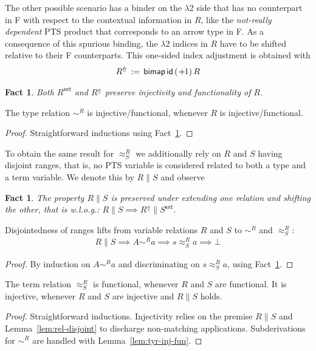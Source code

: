 \documentclass[a4paper,UKenglish]{lipics-v2016}
\newcommand{\ms}{\,}
\newcommand{\mrel}[1]{\mathrel{\ms #1 \ms}}
\newcommand{\eqdef}{\mrel{:=}}
\newcommand{\SysL}{$\lambda$2\xspace}
\newcommand{\tyr}{\mathrel{\sim}}
\newcommand{\tmr}{\mathrel{\approx}}
\newcommand{\Rext}[1]{\ensuremath{#1^{\mathsf{ext}}}}
\newcommand{\Rshift}[1]{\ensuremath{#1^{\Uparrow}}}
\newcommand{\id}{\mathsf{id}}
\newcommand{\shift}{\ensuremath{\hspace{0.1em}\mathsf{+}\hspace{0.08em}\!1}}
\theoremstyle{plain}
\newtheorem{fact}[theorem]{Fact}
\begin{document}
The other possible scenario has a binder on the \SysL side that has no counterpart in F with respect to the contextual information in $R$, like the \emph{not-really dependent} PTS product that corresponds to an arrow type in F.
As a consequence of this spurious binding, the \SysL indices in $R$ have to be shifted relative to their F counterparts.
This one-sided index adjustment is obtained with
\begin{align*}
  \Rshift{R} \eqdef \mathsf{bimap}\,\id\,(\shift)\,R
\end{align*}

\begin{fact}
  \label{fac:rel-ext}
  Both $\Rext{R}$ and $\Rshift{R}$ preserve injectivity and functionality of $R$.\hfill\qedsymbol
\end{fact}

\begin{lemma}
  \label{lem:tyr-inj-fun}
  The type relation $\tyr^R$ is injective/functional, whenever $R$ is injective/functional.
\end{lemma}
\begin{proof}
  Straightforward inductions using Fact~\ref{fac:rel-ext}.
\end{proof}

To obtain the same result for $\tmr^R_S$ we additionally rely on $R$ and $S$ having disjoint ranges, that is, no PTS variable is considered related to both a type and a term variable.
We denote this by $R \| S$ and observe
\begin{fact}
  \label{fac:rel-disjoint}
  The property $R \| S$ is preserved under extending one relation and shifting the other, that is w.l.o.g.: $R \| S \implies \Rshift{R} \| \Rext{S}$.\hfill\qedsymbol
\end{fact}
\begin{lemma}
  \label{lem:rel-disjoint}
  Disjointedness of ranges lifts from variable relations $R$ and $S$ to $\tyr^R$ and $\tmr^R_S$:
  \begin{align*}
    R \| S \implies A \tyr^R a \implies s \tmr^R_S a \implies \bot
  \end{align*}
\end{lemma}
\begin{proof}
  By induction on $A \tyr^R a$ and discriminating on $s \tmr^R_S a$, using Fact~\ref{fac:rel-disjoint}.
\end{proof}
\begin{lemma}
  \label{lem:tmr-inj-fun}
  The term relation $\tmr^R_S$ is functional, whenever $R$ and $S$ are functional.
  It is injective, whenever $R$ and $S$ are injective and $R \| S$ holds.
\end{lemma}
\begin{proof}
  Straightforward inductions.
  Injectivity relies on the premise $R \| S$ and Lemma~\ref{lem:rel-disjoint} to discharge non-matching applications.
  Subderivations for $\tyr^R$ are handled with Lemma~\ref{lem:tyr-inj-fun}.
\end{proof}
\end{document}
